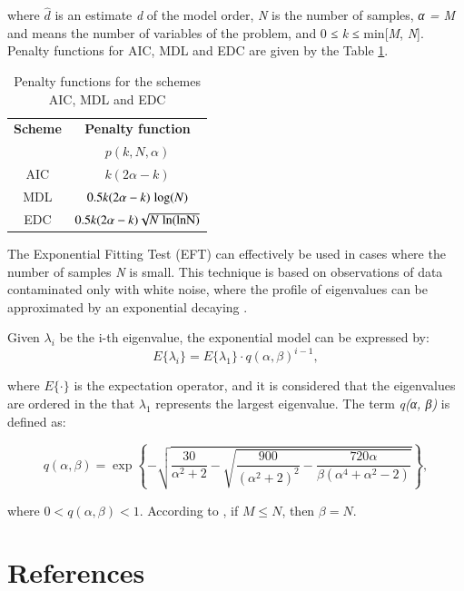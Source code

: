 \documentclass[review]{elsarticle}
\begin{document}
where $\hat{d}$ is an estimate \emph{d} of the model order, \emph{N} is the number of samples, \emph{α = M} and means the number of variables of the problem, and 0 ≤ \emph{k} ≤ min[\emph{M}, \emph{N}]. Penalty functions for AIC, MDL and EDC are given by the Table \ref{tab:tab2}.

\begin{table}[h!]
  \centering
  \caption{Penalty functions for the schemes AIC, MDL and EDC}
  \label{tab:tab2}
  \begin{tabular}{*2c}
	\toprule
	\textbf{Scheme} &  \textbf{Penalty function} \\
	\textbf{} &  $p(k,N,\alpha)$ \\
	\midrule
    AIC	& $k(2\alpha - k)$ \\
    MDL	& $0.5k(2\alpha - k) \hspace{1 mm} {\rm log} (N)$ \\
    EDC	& $0.5k(2\alpha - k)\sqrt{N\hspace{1 mm}\rm ln(\rm ln N)}$ \\
    \bottomrule
  \end{tabular}
\end{table}

The Exponential Fitting Test (EFT) can effectively be used in cases where the number of samples \emph{N} is small. This technique is based on observations of data contaminated only with white noise, where the profile of eigenvalues can be approximated by an exponential decaying \cite{grouffaud1996some}.

Given $\lambda_i$ be the i-th eigenvalue, the exponential model can be expressed by:
\begin{equation}\label{eq:eq3}
E\{\lambda_i\} = E\{\lambda_1\} \cdot q(\alpha,\beta)^{i-1},
\end{equation}

where $E\{\cdot\} $ is the expectation operator, and it is considered that the eigenvalues are ordered in the that $\lambda_1$ represents the largest eigenvalue. The term \emph{q(α, β)} is defined as:

\begin{equation}\label{eq:eq4}
q(\alpha,\beta) = \exp\left\{-\sqrt{\frac{30}{\alpha^2 + 2} - \sqrt{\frac{900}{(\alpha^2 + 2)^2} - \frac{720\alpha}{\beta(\alpha^4 + \alpha^2 - 2)}}} \right\},
\end{equation}

where $0 < q(\alpha,\beta) < 1$. According to \cite{quinlan2006model}, if $M \leq N$, then $\beta = N$.

\section*{References}


\end{document}
